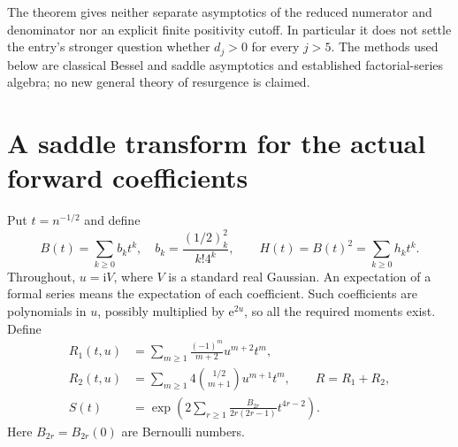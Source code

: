\documentclass[11pt,letterpaper]{article}
\numberwithin{equation}{section}
\theoremstyle{remark}\newtheorem{remark}[theorem]{Remark}
\newcommand{\e}{\mathrm e}
\newcommand{\ii}{\mathrm i}
\begin{document}
The theorem gives neither separate asymptotics of the reduced numerator and denominator nor an explicit finite positivity cutoff. In particular it does not settle the entry's stronger question whether $d_j>0$ for every $j>5$. The methods used below are classical Bessel and saddle asymptotics and established factorial-series algebra; no new general theory of resurgence is claimed.

\section{A saddle transform for the actual forward coefficients}
Put $t=n^{-1/2}$ and define
\begin{equation}\label{eq:BH}
 B(t)=\sum_{k\ge0}b_kt^k,\quad b_k=\frac{(1/2)_k^2}{k!4^k},
 \qquad H(t)=B(t)^2=\sum_{k\ge0}h_kt^k.
\end{equation}
Throughout, $u=\ii V$, where $V$ is a standard real Gaussian. An expectation of a formal series means the expectation of each coefficient. Such coefficients are polynomials in $u$, possibly multiplied by $\e^{2u}$, so all the required moments exist. Define
\begin{align}
 R_1(t,u)&=\sum_{m\ge1}\frac{(-1)^m}{m+2}u^{m+2}t^m,\label{eq:R1}\\
 R_2(t,u)&=\sum_{m\ge1}4\binom{1/2}{m+1}u^{m+1}t^m,
 \qquad R=R_1+R_2,\label{eq:R2}\\
 S(t)&=\exp\!\left(2\sum_{r\ge1}
           \frac{B_{2r}}{2r(2r-1)}t^{4r-2}\right).\label{eq:S}
\end{align}
Here $B_{2r}=B_{2r}(0)$ are Bernoulli numbers.
\end{document}
